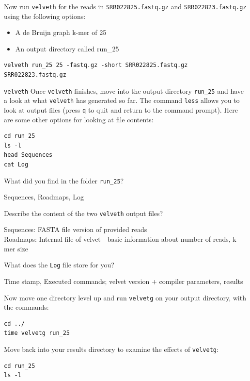 \begin{steps}
Now run \texttt{velveth} for the reads in \texttt{SRR022825.fastq.gz} and
\texttt{SRR022823.fastq.gz} using the following options:
\begin{itemize}
  \item A de Bruijn graph k-mer of 25
  \item An output directory called run\_25
\end{itemize}
\begin{lstlisting}
velveth run_25 25 -fastq.gz -short SRR022825.fastq.gz SRR022823.fastq.gz
\end{lstlisting}

\texttt{velveth} Once \texttt{velveth} finishes, move into the output directory
\texttt{run\_25} and have a look at what \texttt{velveth} has generated so far.
The command \texttt{less} allows you to look at output files (press \texttt{q}
to quit and return to the command prompt). Here are some other options for
looking at file contents:

\begin{lstlisting}
cd run_25
ls -l
head Sequences
cat Log
\end{lstlisting}

\end{steps}

\begin{questions}
What did you find in the folder \texttt{run\_25}?
\begin{answer}
Sequences, Roadmaps, Log
\end{answer}

Describe the content of the two \texttt{velveth} output files?
\begin{answer}
Sequences: FASTA file version of provided reads\\
Roadmaps: Internal file of velvet - basic information about number of reads, k-mer size
\end{answer}

What does the \texttt{Log} file store for you?
\begin{answer}
Time stamp, Executed commands; velvet version + compiler parameters, results
\end{answer}
\end{questions}

\begin{steps}
Now move one directory level up and run \texttt{velvetg} on your output directory, with
the commands:
\begin{lstlisting}
cd ../
time velvetg run_25
\end{lstlisting}

Move back into your results directory to examine the effects of \texttt{velvetg}:
\begin{lstlisting}
cd run_25
ls -l
\end{lstlisting}
\end{steps}

